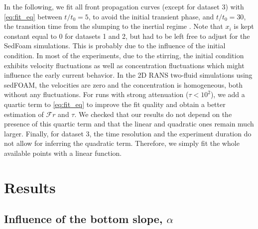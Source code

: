 \documentclass[12pt]{article}
\begin{document}
In the following, we fit all front propagation curves (except for dataset 3) with \eqref{eq:fit_eq} between $t/t_{0} = 5$, to avoid the initial transient phase, and $t/t_{0} = 30$, the transition time from the slumping to the inertial regime \citep[similar to $X_{\text{t}}/L_{0}\approx 10$ as mentioned in section \ref{sec:intro_lockrelease}; see also e.g.][]{Rottman1983, Sher2015, Ottolenghi2016}. Note that $x_{i}$ is kept constant equal to 0 for datasets 1 and 2, but had to be left free to adjust for the SedFoam simulations. This is probably due to the influence of the initial condition. In most of the experiments, due to the stirring, the initial condition exhibits velocity fluctuations as well as concentration fluctuations which might influence the early current behavior. In the 2D RANS two-fluid simulations using sedFOAM, the velocities are zero and the concentration is homogeneous, both without any fluctuations. For runs with strong attenuation ($\tau < 10^{2}$), we add a quartic term to \eqref{eq:fit_eq} to improve the fit quality and obtain a better estimation of $\mathcal{F}r$ and $\tau$. We checked that our results do not depend on the presence of this quartic term and that the linear and quadratic ones remain much larger. Finally, for dataset 3, the time resolution and the experiment duration do not allow for inferring the quadratic term. Therefore, we simply fit the whole available points with a linear function.

\section{Results}
\label{sec:results}

\subsection{Influence of the bottom slope, $\alpha$}
\label{sec:influence_slope}
\end{document}
